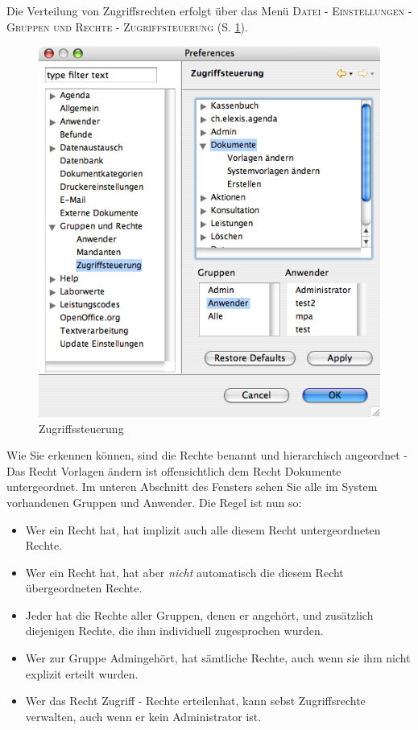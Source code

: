 Die Verteilung von Zugriffsrechten erfolgt über das Menü \textsc{Datei -
Einstellungen - Gruppen und Rechte - Zugriffsteuerung} (S. \ref{fig:zugriff}).
\begin{figure}[htp]
\begin{center}
  \includegraphics{images/zugriff}
  \caption{Zugriffssteuerung}
  \label{fig:zugriff}
\end{center}
\end{figure}

Wie Sie erkennen können, sind die Rechte benannt und hierarchisch angeordnet -
Das Recht \glqq Vorlagen ändern\grqq{} ist offensichtlich dem Recht \glqq
Dokumente\grqq{} untergeordnet. Im unteren Abschnitt des Fensters sehen Sie alle
im System vorhandenen Gruppen und Anwender.
Die Regel ist nun so:
\begin{itemize}
  \item Wer ein Recht hat, hat implizit auch alle diesem Recht untergeordneten
  Rechte.
  \item Wer ein Recht hat, hat aber \textit{nicht} automatisch die diesem Recht
  übergeordneten Rechte.
  \item Jeder hat die Rechte aller Gruppen, denen er angehört, und zusätzlich
  diejenigen Rechte, die ihm individuell zugesprochen wurden.
  \item Wer zur Gruppe \glqq Admin\grqq gehört, hat sämtliche Rechte, auch wenn
  sie ihm nicht explizit erteilt wurden.
  \item Wer das Recht \glqq Zugriff - Rechte erteilen\grqq hat, kann sebst
  Zugriffsrechte verwalten, auch wenn er kein Administrator ist.
\end{itemize}


